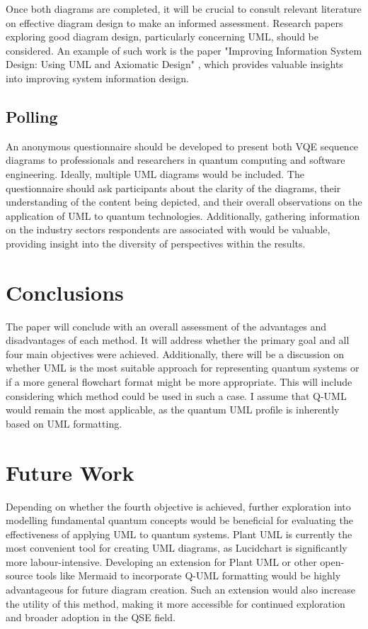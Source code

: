 \documentclass{article}
\begin{document}
Once both diagrams are completed, it will be crucial to consult relevant literature on effective diagram design to make an informed assessment. Research papers exploring good diagram design, particularly concerning UML, should be considered. An example of such work is the paper "Improving Information System Design: Using UML and Axiomatic Design" \cite{CAVIQUE2022103569}, which provides valuable insights into improving system information design.

\subsection{Polling}

An anonymous questionnaire should be developed to present both VQE sequence diagrams to professionals and researchers in quantum computing and software engineering. Ideally, multiple UML diagrams would be included. The questionnaire should ask participants about the clarity of the diagrams, their understanding of the content being depicted, and their overall observations on the application of UML to quantum technologies. Additionally, gathering information on the industry sectors respondents are associated with would be valuable, providing insight into the diversity of perspectives within the results.

\section{Conclusions}

The paper will conclude with an overall assessment of the advantages and disadvantages of each method. It will address whether the primary goal and all four main objectives were achieved. Additionally, there will be a discussion on whether UML is the most suitable approach for representing quantum systems or if a more general flowchart format might be more appropriate. This will include considering which method could be used in such a case. I assume that Q-UML would remain the most applicable, as the quantum UML profile is inherently based on UML formatting.

\section{Future Work}

Depending on whether the fourth objective is achieved, further exploration into modelling fundamental quantum concepts would be beneficial for evaluating the effectiveness of applying UML to quantum systems.
Plant UML is currently the most convenient tool for creating UML diagrams, as Lucidchart is significantly more labour-intensive. Developing an extension for Plant UML or other open-source tools like Mermaid to incorporate Q-UML formatting would be highly advantageous for future diagram creation. Such an extension would also increase the utility of this method, making it more accessible for continued exploration and broader adoption in the QSE field.
\end{document}
